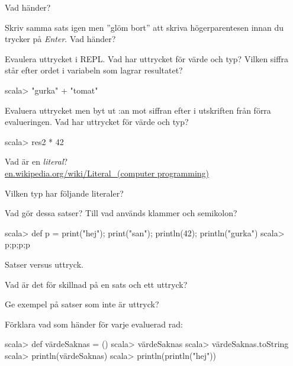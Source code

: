 \Subtask Vad händer? 

\Subtask Skriv samma sats igen men ''glöm bort'' att skriva högerparentesen innan du trycker på \textit{Enter}. Vad händer?

\Subtask Evaulera uttrycket  i REPL. Vad har uttrycket för värde och typ? Vilken siffra står efter ordet  i variabeln som lagrar resultatet?

\begin{REPLnonum}
scala> "gurka" + "tomat"   
\end{REPLnonum}

\Subtask Evaluera uttrycket  men byt ut :an mot siffran efter  i utskriften från förra evalueringen. Vad har uttrycket för värde och typ?
\begin{REPLnonum}
scala> res2 * 42
\end{REPLnonum}


\Task\Pen Vad är en \textit{literal}? \\ \href{https://en.wikipedia.org/wiki/Literal\_\%28computer_programming\%29}{en.wikipedia.org/wiki/Literal\_(computer programming)}

\Task Vilken typ har följande literaler?

\Subtask {} 

\Subtask {}

\Subtask {}

\Subtask {}

\Subtask {}

\Subtask {}

\Subtask {}

\Subtask {}

\Subtask {}

\Subtask {}

\Subtask {}


\Task\Pen Vad gör dessa satser? Till vad används klammer och semikolon?
\begin{REPLnonum}
scala> def p = { print("hej"); print("san"); println(42); println("gurka") }
scala> p;p;p;p
\end{REPLnonum}

\Task\Pen Satser versus uttryck. 

\Subtask Vad är det för skillnad på en sats och ett uttryck?

\Subtask Ge exempel på satser som inte är uttryck?

\Subtask Förklara vad som händer för varje evaluerad rad:
\begin{REPL}
scala> def värdeSaknas = ()
scala> värdeSaknas
scala> värdeSaknas.toString
scala> println(värdeSaknas)
scala> println(println("hej"))
\end{REPL}

